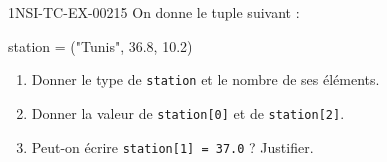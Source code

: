 \begin{exercice}{1NSI-TC-EX-002}{1}{5}
On donne le tuple suivant :
\begin{python}
station = ("Tunis", 36.8, 10.2)
\end{python}
\begin{enumerate}
  \item Donner le type de \lstinline{station} et le nombre de ses éléments.
  \item Donner la valeur de \lstinline{station[0]} et de \lstinline{station[2]}.
  \item Peut-on écrire \lstinline{station[1] = 37.0} ? Justifier.
\end{enumerate}
\end{exercice}
